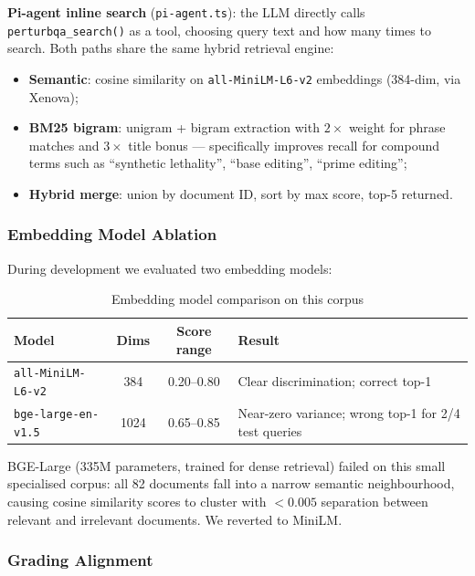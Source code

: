 \documentclass[12pt, a4paper]{article}
\begin{document}
\medskip\noindent\textbf{Pi-agent inline search} (\texttt{pi-agent.ts}): the LLM
directly calls \texttt{perturbqa\_search()} as a tool, choosing query text and how
many times to search. Both paths share the same hybrid retrieval engine:

\begin{itemize}[nosep]
  \item \textbf{Semantic}: cosine similarity on \texttt{all-MiniLM-L6-v2} embeddings (384-dim, via Xenova);
  \item \textbf{BM25 bigram}: unigram + bigram extraction with $2\times$ weight for phrase matches
        and $3\times$ title bonus --- specifically improves recall for compound terms such as
        ``synthetic lethality'', ``base editing'', ``prime editing'';
  \item \textbf{Hybrid merge}: union by document ID, sort by max score, top-5 returned.
\end{itemize}

\subsubsection{Embedding Model Ablation}

During development we evaluated two embedding models:

\begin{table}[ht]
\centering
\caption{Embedding model comparison on this corpus}
\begin{tabular}{lccp{4.5cm}}
\toprule
\textbf{Model} & \textbf{Dims} & \textbf{Score range} & \textbf{Result} \\
\midrule
\texttt{all-MiniLM-L6-v2} & 384 & 0.20--0.80 & Clear discrimination; correct top-1 \\
\texttt{bge-large-en-v1.5} & 1024 & 0.65--0.85 & Near-zero variance; wrong top-1 for 2/4 test queries \\
\bottomrule
\end{tabular}
\end{table}

BGE-Large (335M parameters, trained for dense retrieval) failed on this small
specialised corpus: all 82 documents fall into a narrow semantic neighbourhood, causing
cosine similarity scores to cluster with $<0.005$ separation between relevant and
irrelevant documents.  We reverted to MiniLM.

\subsubsection{Grading Alignment}
\end{document}
